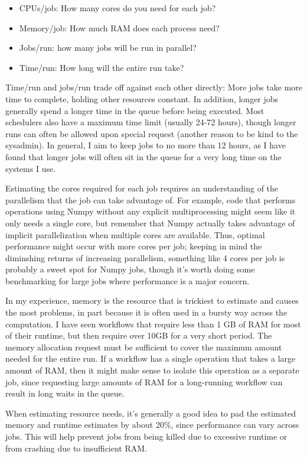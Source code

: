 \begin{itemize}
\item CPUs/job: How many cores do you need for each job?
\item Memory/job: How much RAM does each process need?
\item Jobs/run: how many jobs will be run in parallel?
\item Time/run: How long will the entire run take?
\end{itemize}

Time/run and jobs/run trade off against each other directly: More jobs take more time to complete, holding other resources constant.  In addition, longer jobs generally spend a longer time in the queue before being executed.  Most schedulers also have a maximum time limit (usually 24-72 hours), though longer runs can often be allowed upon special request (another reason to be kind to the sysadmin). In general, I aim to keep jobs to no more than 12 hours, as I have found that longer jobs will often sit in the queue for a very long time on the systems I use.

Estimating the cores required for each job requires an understanding of the parallelism that the job can take advantage of.  For example, code that performs operations using Numpy without any explicit multiprocessing might seem like it only needs a single core, but remember that Numpy actually takes advantage of implicit parallelization when multiple cores are available.  Thus, optimal performance might occur with more cores per job; keeping in mind the diminshing returns of increasing parallelism, something like 4 cores per job is probably a sweet spot for Numpy jobs, though it's worth doing some benchmarking for large jobs where performance is a major concern.

In my experience, memory is the resource that is trickiest to estimate and causes the most problems, in part because it is often used in a bursty way across the computation.  I have seen workflows that require less than 1 GB of RAM for most of their runtime, but then require over 10GB for a very short period.  The memory allocation request must be sufficient to cover the maximum amount needed for the entire run.  If a workflow has a single operation that takes a large amount of RAM, then it might make sense to isolate this operation as a separate job, since requesting large amounts of RAM for a long-running workflow can result in long waits in the queue.

When estimating resource needs, it's generally a good idea to pad the estimated memory and runtime estimates by about 20\%, since performance can vary across jobs.  This will help prevent jobs from being killed due to excessive runtime or from crashing due to insufficient RAM.

